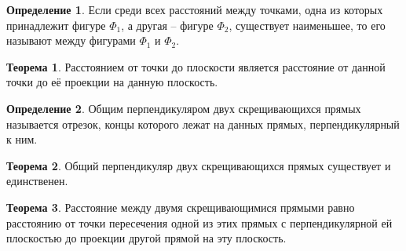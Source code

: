 \documentclass[12pt]{article}
\theoremstyle{definition}
\newtheorem{theorem}{Теорема}[section]
\newtheorem{definition}{Определение}
\begin{document}
\begin{definition}
    Если среди всех расстояний между точками, одна из которых принадлежит фигуре $\Phi_1$, а другая – фигуре $\Phi_2$, существует наименьшее, то его называют между фигурами $\Phi_1$ и $\Phi_2$.
\end{definition}
\begin{theorem}
    Расстоянием от точки до плоскости является расстояние от данной точки до её проекции на данную плоскость.
\end{theorem}
\begin{definition}
    Общим перпендикуляром двух скрещивающихся прямых называется отрезок, концы которого лежат на данных прямых, перпендикулярный к ним.
\end{definition}
\begin{theorem}
    Общий перпендикуляр двух скрещивающихся прямых существует и единственен.
\end{theorem}
\begin{theorem}
    Расстояние между двумя скрещивающимися прямыми равно расстоянию от точки пересечения одной из этих прямых с перпендикулярной ей плоскостью до проекции другой прямой на эту плоскость.
\end{theorem}
\end{document}
